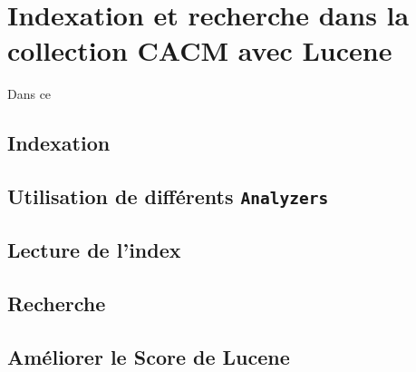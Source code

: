 \chapter{Indexation et recherche dans la collection CACM avec Lucene}

Dans ce 

\section{Indexation}


\section{Utilisation de différents \texttt{Analyzers}}


\section{Lecture de l'index}


\section{Recherche}


\section{Améliorer le Score de Lucene}


